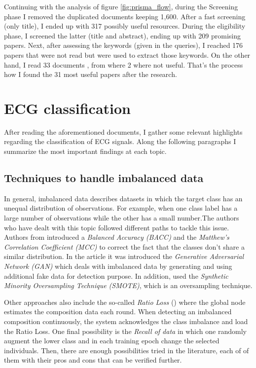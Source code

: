 Continuing with the analysis of figure \ref{fig:prisma_flow}, during the Screening phase I removed the duplicated documents keeping 1,600. After a fast screening (only title), I ended up with 317 possibly useful resources. During the eligibility phase, I screened the latter (title and abstract), ending up with 209 promising papers. Next, after assessing the keywords (given in the queries), I  reached 176 papers that were not read but were used to extract those keywords. On the other hand, I read 33 documents , from where 2 where not useful. That's the process how I found the 31 most useful papers after the research.

\section{ECG classification} \label{3state_art_ECG}

After reading the aforementioned documents, I gather some relevant highlights regarding the classification of ECG signals. Along the following paragraphs I summarize the most important findings at each topic.

\subsection{Techniques to handle imbalanced data}

In general, imbalanced data describes datasets in which the target class has an unequal distribution of observations. For example, when one class label has a large number of observations while the other has a small number.The authors who have dealt with this topic followed different paths to tackle this issue. Authors from \cite{imbalance_data1} introduced a \textit{Balanced Accuracy (BACC)} and the \textit{Matthew’s Correlation Coefficient (MCC)} to correct the fact that the classes don't share a similar distribution. In the article \cite{imbalance_data2} it was introduced the \textit{Generative Adversarial Network (GAN)} which deals with imbalanced data by generating and using additional fake data for detection purpose. In addition, \cite{imbalance_data3} used the \textit{Synthetic Minority Oversampling Technique (SMOTE)}, which is an oversampling technique. 

Other approaches also include the so-called \textit{Ratio Loss} (\cite{imbalance_data4}) where the global node estimates the composition data each round. When detecting an imbalanced composition continuously, the system acknowledges the class imbalance and load the Ratio Loss. One final possibility is the \textit{Recall of data} in which one randomly augment the lower class and in each training epoch change the selected individuals. Then, there are enough possibilities tried in the literature, each of of them with their pros and cons that can be verified further.



